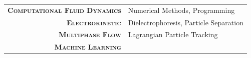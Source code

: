 
\vspace{10pt}

\begin{tabular}{rl}
  \textsc{\textbf{Computational Fluid Dynamics}} & Numerical Methods, Programming \\
  \textsc{\textbf{Electrokinetic}} & Dielectrophoresis, Particle Separation \\
  \textsc{\textbf{Multiphase Flow}} & Lagrangian Particle Tracking \\
  \textsc{\textbf{Machine Learning}}
\end{tabular}
